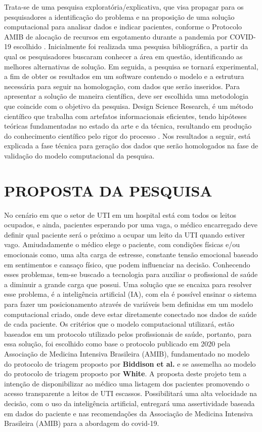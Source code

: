 \documentclass[12pt]{article}
\begin{document}
Trata-se de uma pesquisa exploratória/explicativa, que visa propagar para os pesquisadores a identificação do problema e na proposição de uma solução computacional para analisar dados e indicar pacientes, conforme o Protocolo AMIB de alocação de recursos em esgotamento durante a pandemia por COVID-19 escolhido \cite{kretzer2020protocolo}.
Inicialmente foi realizada uma pesquisa bibliográfica, a partir da qual os pesquisadores buscaram conhecer a área em questão, identificando as melhores alternativas de solução. Em seguida, a pesquisa se tornará experimental, a fim de obter os resultados em um software contendo o modelo e a estrutura necessária para seguir na homologação, com dados que serão inseridos. 
Para apresentar a solução de maneira científica, deve ser escolhida uma metodologia que coincide com o objetivo da pesquisa. Design Science Research, é um método científico que trabalha com artefatos informacionais eficientes, tendo hipóteses teóricas fundamentadas no estado da arte e da técnica, resultando em produção do conhecimento científico pelo rigor do processo \cite{pimentel2020design}.
Nos resultados a seguir, está explicada a fase técnica para geração dos dados que serão homologados na fase de validação do modelo computacional da pesquisa.




\section{PROPOSTA DA PESQUISA}
No cenário em que o setor de UTI em um hospital está com todos os leitos ocupados, e ainda, pacientes esperando por uma vaga, o médico encarregado deve definir qual paciente será o próximo a ocupar um leito da UTI quando estiver vago. Amiudadamente o médico elege o paciente, com condições físicas e/ou emocionais como, uma alta carga de estresse, constante tensão emocional baseado em sentimentos e cansaço físico, que podem influenciar na decisão.
Conhecendo esses problemas, tem-se buscado a tecnologia para auxiliar o profissional de saúde a diminuir a grande carga que possui. Uma solução que se encaixa para resolver esse problema, é a inteligência artificial (IA), com ela é possível ensinar o sistema para fazer um posicionamento através de variáveis bem definidas em um modelo computacional criado, onde deve estar diretamente conectado nos dados de saúde de cada paciente.
Os critérios que o modelo computacional utilizará, estão baseados em um protocolo utilizado pelos profissionais de saúde, portanto, para essa solução, foi escolhido como base o protocolo publicado em 2020 pela Associação de Medicina Intensiva Brasileira (AMIB), fundamentado no modelo do protocolo de triagem proposto por \textbf{Biddison et al.}\cite{biddison2019too} e se assemelha ao modelo do protocolo de triagem proposto por \textbf{White}\cite{white2009should, white2020}.
A proposta deste projeto tem a intenção de disponibilizar ao médico uma listagem dos pacientes promovendo o acesso transparente a leitos de UTI escassos. Possibilitará uma alta velocidade na decisão, com o uso da inteligência artificial, entregará uma assertividade baseada em dados do paciente e nas recomendações da Associação de Medicina Intensiva Brasileira (AMIB) para a abordagem do covid-19.
\end{document}
